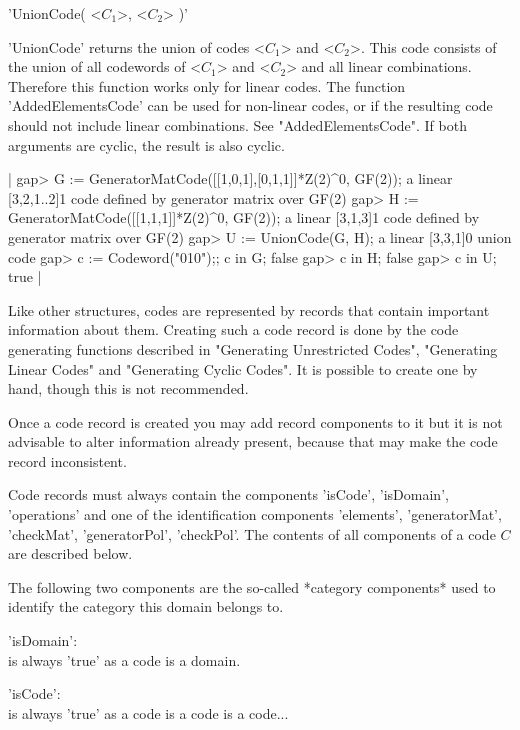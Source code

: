 
'UnionCode( <$C_1$>, <$C_2$> )'

'UnionCode' returns  the union of codes   <$C_1$> and <$C_2$>.  This code
consists of  the union of  all codewords of <$C_1$>  and  <$C_2$> and all
linear combinations. Therefore   this   function works only  for   linear
codes. The function 'AddedElementsCode' can be used for non-linear codes,
or if  the  resulting code should not   include linear combinations.  See
"AddedElementsCode".  If both arguments  are  cyclic, the result  is also
cyclic.

|    gap> G := GeneratorMatCode([[1,0,1],[0,1,1]]*Z(2)^0, GF(2));
    a linear [3,2,1..2]1 code defined by generator matrix over GF(2)
    gap> H := GeneratorMatCode([[1,1,1]]*Z(2)^0, GF(2));
    a linear [3,1,3]1 code defined by generator matrix over GF(2)
    gap> U := UnionCode(G, H);
    a linear [3,3,1]0 union code
    gap> c := Codeword("010");; c in G;
    false
    gap> c in H;
    false
    gap> c in U;
    true |


Like other  {\GAP} structures,   codes are  represented by  records  that
contain important information about them.  Creating such a code record is
done by the   code    generating  functions described    in   "Generating
Unrestricted Codes",   "Generating Linear Codes" and   "Generating Cyclic
Codes".  It  is  possible to  create  one  by hand,  though  this  is not
recommended.

Once a code record is created you may add record  components to it but it
is not advisable to alter  information already present, because that  may
make the code record inconsistent.

Code  records  must always contain  the  components 'isCode', 'isDomain',
'operations'   and  one  of the   identification   components 'elements',
'generatorMat', 'checkMat', 'generatorPol',  'checkPol'. The contents  of
all components of a code $C$ are described below.

The following two components are the so-called *category components* used
to identify the category this domain belongs to.

'isDomain': \\
        is always 'true' as a code is a domain.

'isCode': \\
        is always 'true' as a code is a code is a code...

